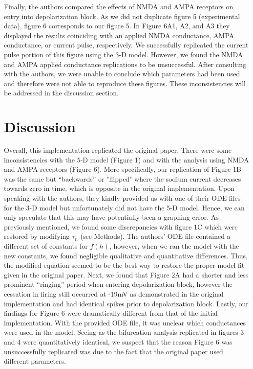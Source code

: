 Finally, the authors compared the effects of NMDA and AMPA receptors on entry into depolarization block. As we did not duplicate figure 5 (experimental data), figure 6 corresponds to our figure 5. In Figure 6A1, A2, and A3 they displayed the results coinciding with an applied NMDA conductance, AMPA conductance, or current pulse, respectively. We successfully replicated the current pulse portion of this figure using the 3-D model. However, we found the NMDA and AMPA applied conductance replications to be unsuccessful. After consulting with the authors, we were unable to conclude which parameters had been used and therefore were not able to reproduce these figures. These inconsistencies will be addressed in the discussion section.  

\section{Discussion}

Overall, this implementation replicated the original paper. There were some inconsistencies with the 5-D model (Figure 1) and with the analysis using NMDA and AMPA receptors (Figure 6). More specifically, our replication of Figure 1B was the same but “backwards” or "flipped" where the sodium current decreases towards zero in time, which is opposite in the original implementation. Upon speaking with the authors, they kindly provided us with one of their ODE files for the 3-D model but unfortunately did not have the 5-D model. Hence, we can only speculate that this may have potentially been a graphing error. As previously mentioned, we found some discrepancies with figure 1C which were restored by modifying $\tau_n$  (see Methods). The authors’ ODE file contained a different set of constants for $f(h)$, however, when we ran the model with the new constants, we found negligible qualitative and quantitative differences.  Thus, the modified equation seemed to be the best way to restore the proper model fit given in the original paper. Next, we found that Figure 2A had a shorter and less prominent “ringing” period when entering depolarization block, however the cessation in firing still occurred at -19mV as demonstrated in the original implementation and had identical spikes prior to depolarization block. Lastly, our findings for Figure 6 were dramatically different from that of the initial implementation. With the provided ODE file, it was unclear which conductances were used in the model. Seeing as the bifurcation analysis replicated in figures 3 and 4 were quantitatively identical, we suspect that the reason Figure 6 was unsuccessfully replicated was due to the fact that the original paper used different parameters.

